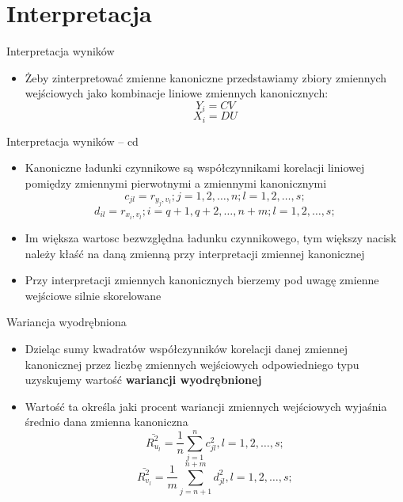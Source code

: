 \documentclass{beamer}
\begin{document}
\section{Interpretacja}

\begin{frame}{Interpretacja wyników}
  \begin{itemize}
\item Żeby zinterpretować zmienne kanoniczne przedstawiamy zbiory zmiennych wejściowych jako kombinacje liniowe
  zmiennych kanonicznych:
  $$ Y_i = CV $$
  $$ X_i = DU $$
  \end{itemize}
\end{frame}

\begin{frame}{Interpretacja wyników -- cd}
  \begin{itemize}
  \item Kanoniczne ładunki czynnikowe są współczynnikami korelacji liniowej pomiędzy zmiennymi pierwotnymi a zmiennymi kanonicznymi
    $$c_{jl}= r_{y_j,v_l}; j = 1, 2, \dots , n; l = 1, 2, \dots, s;$$
    $$d_{il}= r_{x_i,v_l}; i = q + 1, q + 2, \dots, n + m; l = 1, 2, \dots, s;$$
  \item Im większa wartosc bezwzględna ładunku czynnikowego, tym większy nacisk należy kłaść na daną zmienną przy interpretacji zmiennej kanonicznej
  \item Przy interpretacji zmiennych kanonicznych bierzemy pod uwagę zmienne wejściowe silnie skorelowane
  \end{itemize}
\end{frame}

\begin{frame}{Wariancja wyodrębniona}
  \begin{itemize}
  \item Dzieląc sumy kwadratów współczynników korelacji danej zmiennej kanonicznej przez liczbę zmiennych wejściowych odpowiedniego typu uzyskujemy wartość \textbf{wariancji wyodrębnionej}
  \item Wartość ta określa jaki procent wariancji zmiennych wejściowych wyjaśnia średnio dana zmienna kanoniczna
    $$\bar{R^2_{u_l}} = \frac{1}{n} \sum_{j=1}^{n} c^2_{jl}, l = 1,2,\dots,s;$$
    $$\bar{R^2_{v_l}} = \frac{1}{m} \sum_{j=n+1}^{n+m} d^2_{jl}, l = 1,2,\dots,s;$$
  \end{itemize}
\end{frame}
\end{document}
